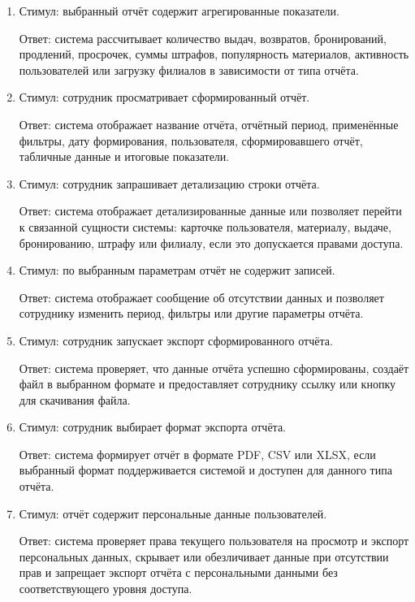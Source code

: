 \documentclass[12pt,a4paper]{article}
\begin{document}
\begin{enumerate}
		Ответ: система формирует отчёт за выбранный период, применяет фильтры,
		рассчитывает итоговые показатели и отображает результат в интерфейсе системы.
		
		\item Стимул: выбранный отчёт содержит агрегированные показатели.
		
		Ответ: система рассчитывает количество выдач, возвратов, бронирований,
		продлений, просрочек, суммы штрафов, популярность материалов, активность
		пользователей или загрузку филиалов в зависимости от типа отчёта.
		
		\item Стимул: сотрудник просматривает сформированный отчёт.
		
		Ответ: система отображает название отчёта, отчётный период, применённые
		фильтры, дату формирования, пользователя, сформировавшего отчёт, табличные
		данные и итоговые показатели.
		
		\item Стимул: сотрудник запрашивает детализацию строки отчёта.
		
		Ответ: система отображает детализированные данные или позволяет перейти
		к связанной сущности системы: карточке пользователя, материалу, выдаче,
		бронированию, штрафу или филиалу, если это допускается правами доступа.
		
		\item Стимул: по выбранным параметрам отчёт не содержит записей.
		
		Ответ: система отображает сообщение об отсутствии данных и позволяет
		сотруднику изменить период, фильтры или другие параметры отчёта.
		
		\item Стимул: сотрудник запускает экспорт сформированного отчёта.
		
		Ответ: система проверяет, что данные отчёта успешно сформированы, создаёт
		файл в выбранном формате и предоставляет сотруднику ссылку или кнопку
		для скачивания файла.
		
		\item Стимул: сотрудник выбирает формат экспорта отчёта.
		
		Ответ: система формирует отчёт в формате PDF, CSV или XLSX, если выбранный
		формат поддерживается системой и доступен для данного типа отчёта.
		
		\item Стимул: отчёт содержит персональные данные пользователей.
		
		Ответ: система проверяет права текущего пользователя на просмотр и экспорт
		персональных данных, скрывает или обезличивает данные при отсутствии прав
		и запрещает экспорт отчёта с персональными данными без соответствующего
		уровня доступа.
		

\end{enumerate}
\end{document}
